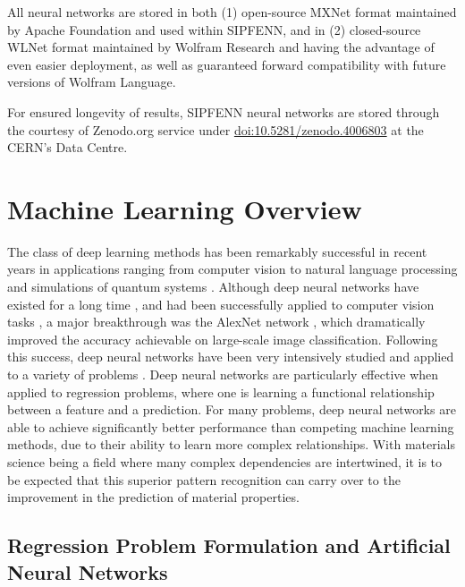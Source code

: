 All neural networks are stored in both (1) open-source MXNet format maintained by Apache Foundation and used within SIPFENN, and in (2) closed-source WLNet format maintained by Wolfram Research and having the advantage of even easier deployment, as well as guaranteed forward compatibility with future versions of Wolfram Language.

For ensured longevity of results, SIPFENN neural networks are stored through the courtesy of Zenodo.org service under \hyperlink{doi:10.5281/zenodo.4006803}{doi:10.5281/zenodo.4006803} at the CERN’s Data Centre.


\printbibliography[heading=subbibintoc]

\appendix

\section{Machine Learning Overview} \label{sipfenn:appedix1}
The class of deep learning methods has been remarkably successful in recent years in applications ranging from computer vision to natural language processing and simulations of quantum systems \cite{lecun2015deep,silver2016mastering,devlin2018bert,carleo2017solving}. Although deep neural networks have existed for a long time \cite{rosenblatt1958perceptron}, and had been successfully applied to computer vision tasks \cite{lecun1995comparison,lecun1990handwritten,lecun1998gradient}, a major breakthrough was the AlexNet network \cite{krizhevsky2012imagenet}, which dramatically improved the accuracy achievable on large-scale image classification. Following this success, deep neural networks have been very intensively studied and applied to a variety of problems \cite{lecun2015deep,silver2016mastering,devlin2018bert}. Deep neural networks are particularly effective when applied to regression problems, where one is learning a functional relationship between a feature and a prediction. For many problems, deep neural networks are able to achieve significantly better performance than competing machine learning methods, due to their ability to learn more complex relationships. With materials science being a field where many complex dependencies are intertwined, it is to be expected that this superior pattern recognition can carry over to the improvement in the prediction of material properties.

\subsection{Regression Problem Formulation and Artificial Neural Networks}
\label{sipfenn:ssec:regressionformulation}

